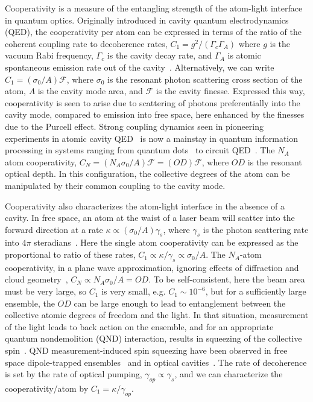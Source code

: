 \documentclass[preprint,aps,pra,onecolumn,superscriptaddress]{revtex4-1} %
\begin{document}
Cooperativity is a measure of the entangling strength of the atom-light interface in quantum optics.  Originally introduced in cavity quantum electrodynamics (QED), the cooperativity per atom can be expressed in terms of the ratio of the coherent coupling rate to decoherence rates, $C_1 = g^2/(\Gamma_c \Gamma_A)$ where $g$ is the vacuum Rabi frequency,  $\Gamma_c$ is the cavity decay rate, and $\Gamma_A$ is atomic spontaneous emission rate out of the cavity~\cite{Kimble1998}.  Alternatively, we can write $C_1 = (\sigma_0/A) \mathcal{F}$, where $\sigma_0$ is the resonant photon scattering cross section of the atom, $A$ is the cavity mode area, and $\mathcal{F}$ is the cavity finesse.  Expressed this way, cooperativity is seen to arise due to scattering of photons preferentially into the cavity mode, compared to emission into free space, here enhanced by the finesses due to the Purcell effect. Strong coupling dynamics seen in pioneering experiments in atomic cavity QED~\cite{Raimond2001Manipulating, Miller2005} is now a mainstay in quantum information processing in systems ranging from quantum dots~\cite{Akimov2007, Akopian2006, Liu2010} to circuit QED~\cite{Wallraff2004Strong, Hofheinz2009Synthesizing}.  The $N_A$ atom cooperativity, $C_N = (N_A \sigma_0/A) \mathcal{F} =( OD) \mathcal{F}$, where $OD$ is the resonant optical depth.  In this configuration, the collective degrees of the atom can be manipulated by their common coupling to the cavity mode.

Cooperativity also characterizes the atom-light interface in the absence of a cavity.  In free space, an atom at the waist of a laser beam will scatter into the forward direction at a rate $\kappa \propto (\sigma_0/A) \gamma_s$, where $\gamma_s$ is the photon scattering rate into $4 \pi$ steradians~\cite{Baragiola2014}.  Here the single atom cooperativity can be expressed as the proportional to ratio of these rates, $C_1 \propto \kappa/\gamma_s \propto \sigma_0/A$.  The $N_A$-atom cooperativity, in a plane wave approximation, ignoring effects of diffraction and cloud geometry~\cite{Baragiola2014}, $C_N \propto N_A \sigma_0/A = OD$.  To be self-consistent, here the beam area must be very large, so $C_1$ is very small, e.g. $C_1 \sim 10^{-6}$, but for a sufficiently large ensemble, the $OD$ can be large enough to lead to entanglement between the collective atomic degrees of freedom and the light.  In that situation, measurement of the light leads to back action on the ensemble, and for an appropriate quantum nondemolition (QND) interaction, results in squeezing of the collective spin~\cite{Kuzmich1998, Takahashi1999Quantum}. QND measurement-induced spin squeezing have been observed in free space dipole-trapped ensembles~\cite{Appel2009Mesoscopic, Takano2009Spin, Sewell2012Magnetic} and in optical cavities~\cite{Schleier-Smith2010States, Cox2016Deterministic, Hosten2016}. The rate of decoherence is set by the rate of optical pumping,  $\gamma_{op} \propto \gamma_s$, and we can characterize the cooperativity/atom by $C_1 = \kappa/\gamma_{op}$.
\end{document}
